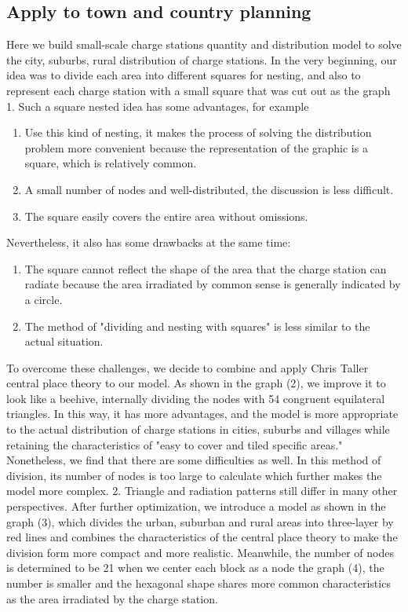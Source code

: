 \documentclass{mcmthesis}
\begin{document}
\subsection{Apply to town and country planning}
	Here we build small-scale charge stations quantity and distribution model to solve the city, suburbs, rural distribution of charge stations.
In the very beginning, our idea was to divide each area into different squares for nesting, and also to represent each charge station with a small square that was cut out as the graph 1. Such a square nested idea has some advantages, for example
\begin{enumerate}[1.]
\item Use this kind of nesting, it makes the process of solving the distribution problem more convenient because the representation of the graphic is a square, which is relatively common. 
\item A small number of nodes and well-distributed, the discussion is less difficult. 
\item  The square easily covers the entire area without omissions. 
\end{enumerate}
Nevertheless, it also has some drawbacks at the same time: 
\begin{enumerate}[1.]
\item The square cannot reflect the shape of the area that the charge station can radiate because the area irradiated by common sense is generally indicated by a circle. 
\item The method of "dividing and nesting with squares" is less similar to the actual situation.
\end{enumerate}
To overcome these challenges, we decide to combine and apply Chris Taller central place theory to our model. As shown in the graph (2), we improve it to look like a beehive, internally dividing the nodes with 54 congruent equilateral triangles. In this way, it has more advantages, and the model is more appropriate to the actual distribution of charge stations in cities, suburbs and villages while retaining the characteristics of "easy to cover and tiled specific areas." Nonetheless, we find that there are some difficulties as well. In this method of division, its number of nodes is too large to calculate which further makes the model more complex. 2. Triangle and radiation patterns still differ in many other perspectives. After further optimization, we introduce a model as shown in the graph (3), which divides the urban, suburban and rural areas into three-layer by red lines and combines the characteristics of the central place theory to make the division form more compact and more realistic. Meanwhile, the number of nodes is determined to be 21 when we center each block as a node the graph (4), the number is smaller and the hexagonal shape shares more common characteristics as the area irradiated by the charge station.
\end{document}
